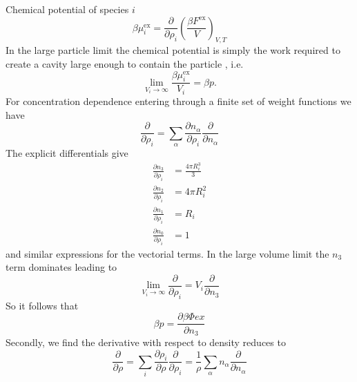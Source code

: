 Chemical potential of species $i$
\begin{equation}
  \beta \mu_i^\mathrm{ex}
  =
  \frac{\partial}{\partial \rho_i}
  \left( \frac{ \beta F^\mathrm{ex} }{V} \right)_{V,T}
\end{equation}
In the large particle limit the chemical potential is simply the work required to create a cavity large enough to contain the particle%
,
i.e.\ \cite{RothJPCM2002,ReissJCP1960}
\begin{equation}
  \lim_{V_i \to \infty} \frac{\beta \mu_i^\mathrm{ex}}{V_i} = \beta p.
\end{equation}
For concentration dependence entering through a finite set of weight functions we have
\begin{equation*}
  \frac{\partial}{\partial \rho_i}
  =
  \sum_\alpha
  \frac{\partial n_\alpha}{\partial \rho_i}
  \frac{\partial}{\partial n_\alpha}
\end{equation*}
The explicit differentials give
\begin{subequations}
  \begin{align}
    \frac{\partial n_3}{\partial \rho_i}
    &=
    \frac{4 \pi R_i^3}{3}
    \\
    \frac{\partial n_2}{\partial \rho_i}
    &=
    4 \pi R_i^2
    \\
    \frac{\partial n_1}{\partial \rho_i}
    &=
    R_i
    \\
    \frac{\partial n_0}{\partial \rho_i}
    &=
    1
  \end{align}
\end{subequations}
and similar expressions for the vectorial terms.
In the large volume limit the $n_3$ term dominates leading to
\begin{equation*}
  \lim_{V_i \to \infty}
  \frac{\partial}{\partial \rho_i}
  =
  V_i \frac{\partial}{\partial n_3}
\end{equation*}
So it follows that
\begin{equation}\label{eq:fmt-pressure}
  \beta p
  =
  \frac{\partial \beta \Phi{ex} }{\partial n_3}
\end{equation}
Secondly, we find the derivative with respect to density reduces to
\begin{equation*}
  \frac{\partial}{\partial \rho}
  =
  \sum_i
  \frac{\partial \rho_i}{\partial \rho}
  \frac{\partial}{\partial \rho_i}
  =
  \frac{1}{\rho}
  \sum_\alpha
  n_\alpha
  \frac{\partial}{\partial n_\alpha}
\end{equation*}
